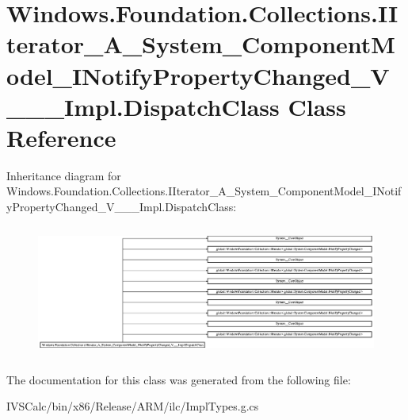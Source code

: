 \hypertarget{class_windows_1_1_foundation_1_1_collections_1_1_i_iterator___a___system___component_model___i_n972649beeff3a495b1824ae5a8cf0f3e}{}\section{Windows.\+Foundation.\+Collections.\+I\+Iterator\+\_\+\+A\+\_\+\+System\+\_\+\+Component\+Model\+\_\+\+I\+Notify\+Property\+Changed\+\_\+\+V\+\_\+\+\_\+\+\_\+\+Impl.\+Dispatch\+Class Class Reference}
\label{class_windows_1_1_foundation_1_1_collections_1_1_i_iterator___a___system___component_model___i_n972649beeff3a495b1824ae5a8cf0f3e}
Inheritance diagram for Windows.\+Foundation.\+Collections.\+I\+Iterator\+\_\+\+A\+\_\+\+System\+\_\+\+Component\+Model\+\_\+\+I\+Notify\+Property\+Changed\+\_\+\+V\+\_\+\+\_\+\+\_\+\+Impl.\+Dispatch\+Class\+:\begin{figure}[H]
\begin{center}
\leavevmode
\includegraphics[height=4.375000cm]{class_windows_1_1_foundation_1_1_collections_1_1_i_iterator___a___system___component_model___i_n972649beeff3a495b1824ae5a8cf0f3e}
\end{center}
\end{figure}


The documentation for this class was generated from the following file\+:\begin{DoxyCompactItemize}
\item 
I\+V\+S\+Calc/bin/x86/\+Release/\+A\+R\+M/ilc/Impl\+Types.\+g.\+cs\end{DoxyCompactItemize}

